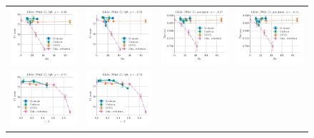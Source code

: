 \begin{figure}
\begin{tabular}{@{\hskip -0.0in}c@{\hskip -0.0in}c@{\hskip -0.0in}c@{\hskip -0.0in}c@{\hskip -0.0in}}
		\includegraphics[width=.245\linewidth]{figures/glove-wiki400k-am_qa_best-f1_vs_gram-large-dim-delta2-2_linx_det.pdf} &
		\includegraphics[width=.245\linewidth]{figures/glove-wiki400k-am_qa_best-f1_vs_gram-large-dim-delta2-2_linx_stoc.pdf} &
		\includegraphics[width=.245\linewidth]{figures/glove-wiki400k-am_sentiment_sst_test-acc_vs_gram-large-dim-delta2-2_linx_det.pdf} & 
		\includegraphics[width=.245\linewidth]{figures/glove-wiki400k-am_sentiment_sst_test-acc_vs_gram-large-dim-delta2-2_linx_stoc.pdf} \\
		\includegraphics[width=.245\linewidth]{figures/glove-wiki400k-am_qa_best-f1_vs_subspace-dist-normalized_linx_det.pdf} &
		\includegraphics[width=.245\linewidth]{figures/glove-wiki400k-am_qa_best-f1_vs_subspace-dist-normalized_linx_stoc.pdf} &

\end{tabular}
\end{figure}
